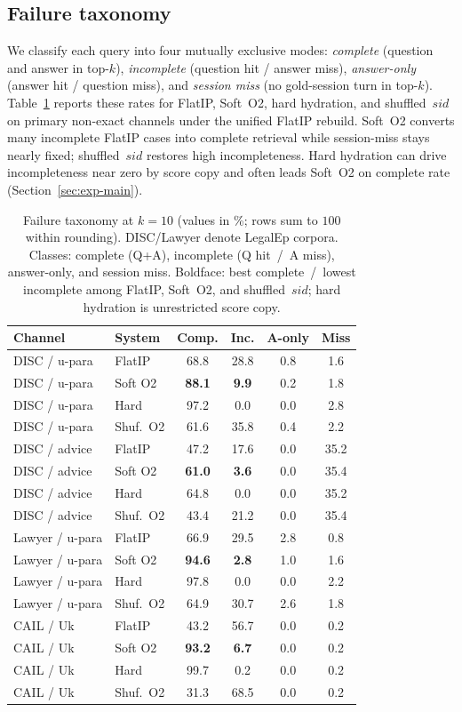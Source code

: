 \documentclass[preprint,12pt,authoryear]{elsarticle}
\newcommand{\tighttab}{\setlength{\tabcolsep}{3.0pt}\renewcommand{\arraystretch}{1.05}}
\begin{document}
\subsection{Failure taxonomy}\label{sec:rq1-failure-taxonomy}
We classify each query into four mutually exclusive modes: \emph{complete} (question and answer in top-$k$), \emph{incomplete} (question hit / answer miss), \emph{answer-only} (answer hit / question miss), and \emph{session miss} (no gold-session turn in top-$k$).
Table~\ref{tab:rq1-failure} reports these rates for FlatIP, Soft~O2, hard hydration, and shuffled~$sid$ on primary non-exact channels under the unified FlatIP rebuild.
Soft~O2 converts many incomplete FlatIP cases into complete retrieval while session-miss stays nearly fixed; shuffled~$sid$ restores high incompleteness.
Hard hydration can drive incompleteness near zero by score copy and often leads Soft~O2 on complete rate (Section~\ref{sec:exp-main}).

\begin{table}[t]
\centering
\caption{Failure taxonomy at $k{=}10$ (values in \%; rows sum to $100$ within rounding). DISC/Lawyer denote LegalEp corpora. Classes: complete (Q+A), incomplete (Q hit~/~A miss), answer-only, and session miss. Boldface: best complete~/~lowest incomplete among FlatIP, Soft~O2, and shuffled~$sid$; hard hydration is unrestricted score copy.}
\label{tab:rq1-failure}
\tighttab\footnotesize
\begin{tabular}{@{}llcccc@{}}
\toprule
\textbf{Channel} & \textbf{System} & \textbf{Comp.} & \textbf{Inc.} & \textbf{A-only} & \textbf{Miss} \\
\midrule
DISC / u-para & FlatIP & 68.8 & 28.8 & 0.8 & 1.6 \\
DISC / u-para & Soft O2 & \textbf{88.1} & \textbf{9.9} & 0.2 & 1.8 \\
DISC / u-para & Hard & 97.2 & 0.0 & 0.0 & 2.8 \\
DISC / u-para & Shuf.\ O2 & 61.6 & 35.8 & 0.4 & 2.2 \\
\midrule
DISC / advice & FlatIP & 47.2 & 17.6 & 0.0 & 35.2 \\
DISC / advice & Soft O2 & \textbf{61.0} & \textbf{3.6} & 0.0 & 35.4 \\
DISC / advice & Hard & 64.8 & 0.0 & 0.0 & 35.2 \\
DISC / advice & Shuf.\ O2 & 43.4 & 21.2 & 0.0 & 35.4 \\
\midrule
Lawyer / u-para & FlatIP & 66.9 & 29.5 & 2.8 & 0.8 \\
Lawyer / u-para & Soft O2 & \textbf{94.6} & \textbf{2.8} & 1.0 & 1.6 \\
Lawyer / u-para & Hard & 97.8 & 0.0 & 0.0 & 2.2 \\
Lawyer / u-para & Shuf.\ O2 & 64.9 & 30.7 & 2.6 & 1.8 \\
\midrule
CAIL / Uk & FlatIP & 43.2 & 56.7 & 0.0 & 0.2 \\
CAIL / Uk & Soft O2 & \textbf{93.2} & \textbf{6.7} & 0.0 & 0.2 \\
CAIL / Uk & Hard & 99.7 & 0.2 & 0.0 & 0.2 \\
CAIL / Uk & Shuf.\ O2 & 31.3 & 68.5 & 0.0 & 0.2 \\
\bottomrule
\end{tabular}
\end{table}
\end{document}
